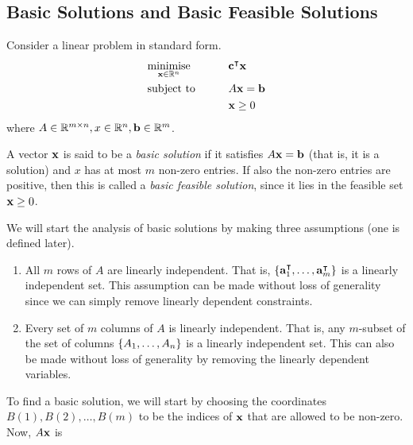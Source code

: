 \subsection{Basic Solutions and Basic Feasible Solutions}
Consider a linear problem in standard form.
\begin{alignat*}{2}
	 & \underset{\vb x \in \mathbb R^n}{\text{minimise}} & \qquad & \vb c^\intercal \vb x \\
	 & \text{subject to}                                 &        & A\vb x = \vb b         \\
	 &                                                   &        & \vb x \geq 0
\end{alignat*}
where \( A \in \mathbb R^{m \times n}, x \in \mathbb R^n, \vb b \in \mathbb R^m \).
\begin{definition}
	A vector \( \vb x \) is said to be a \textit{basic solution} if it satisfies \( A \vb x = \vb b \) (that is, it is a solution) and \( x \) has at most \( m \) non-zero entries.
	If also the non-zero entries are positive, then this is called a \textit{basic feasible solution}, since it lies in the feasible set \( \vb x \geq 0 \).
\end{definition}
\noindent We will start the analysis of basic solutions by making three assumptions (one is defined later).
\begin{enumerate}[A:]
	\item All \( m \) rows of \( A \) are linearly independent.
	      That is, \( \qty{ \vb a_1^\intercal, \dots, \vb a_m^\intercal} \) is a linearly independent set.
	      This assumption can be made without loss of generality since we can simply remove linearly dependent constraints.
	\item Every set of \( m \) columns of \( A \) is linearly independent.
	      That is, any \( m \)-subset of the set of columns \( \qty{ A_1, \dots, A_n } \) is a linearly independent set.
	      This can also be made without loss of generality by removing the linearly dependent variables.
\end{enumerate}
To find a basic solution, we will start by choosing the coordinates \( B(1), B(2), \dots, B(m) \) to be the indices of \( \vb x \) that are allowed to be non-zero.
Now, \( A \vb x \) is
